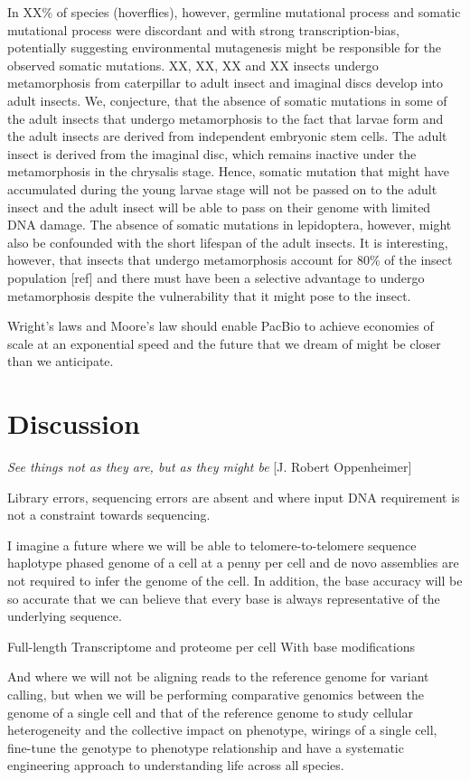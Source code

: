 In XX\% of species (hoverflies), however, germline mutational process and somatic mutational process were discordant and with strong transcription-bias, potentially suggesting environmental mutagenesis might be responsible for the observed somatic mutations. XX, XX, XX and XX insects undergo metamorphosis from caterpillar to adult insect and imaginal discs develop into adult insects. We, conjecture, that the absence of somatic mutations in some of the adult insects that undergo metamorphosis to the fact that larvae form and the adult insects are derived from independent embryonic stem cells. The adult insect is derived from the imaginal disc, which remains inactive under the metamorphosis in the chrysalis stage. Hence, somatic mutation that might have accumulated during the young larvae stage will not be passed on to the adult insect and the adult insect will be able to pass on their genome with limited DNA damage. The absence of somatic mutations in lepidoptera, however, might also be confounded with the short lifespan of the adult insects. It is interesting, however, that insects that undergo metamorphosis account for 80\% of the insect population [ref] and there must have been a selective advantage to undergo metamorphosis despite the vulnerability that it might pose to the insect.

Wright’s laws and Moore’s law should enable PacBio to achieve economies of scale at an exponential speed and the future that we dream of might be closer than we anticipate. 

\section{Discussion}


\textit{See things not as they are, but as they might be} [J. Robert Oppenheimer]

Library errors, sequencing errors are absent and where input DNA requirement is not a constraint towards sequencing. 

I imagine a future where we will be able to telomere-to-telomere sequence haplotype phased genome of a cell at a penny per cell and de novo assemblies are not required to infer the genome of the cell. In addition, the base accuracy will be so accurate that we can believe that every base is always representative of the underlying sequence. 

Full-length
Transcriptome and proteome per cell
With base modifications

And where we will not be aligning reads to the reference genome for variant calling, but when we will be performing comparative genomics between the genome of a single cell and that of the reference genome to study cellular heterogeneity and the collective impact on phenotype, wirings of a single cell, fine-tune the genotype to phenotype relationship and have a systematic engineering approach to understanding life across all species.


